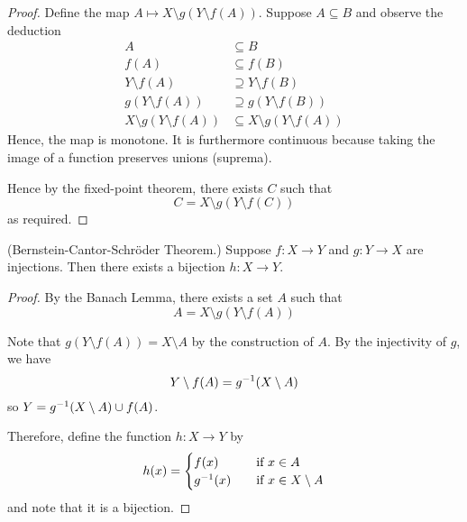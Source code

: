 \documentclass[11pt]{article}
\begin{document}
\begin{proof}
    Define the map $A \mapsto X \setminus g(Y \setminus f(A))$.
    Suppose $A \subseteq B$ and observe the deduction
    \begin{align*}
        A &\subseteq B \\
        f(A) &\subseteq f(B) \\
        Y \setminus f(A) &\supseteq Y \setminus f(B) \\
        g(Y \setminus f(A)) &\supseteq g(Y \setminus f(B)) \\
        X \setminus g(Y \setminus f(A))
            &\subseteq X \setminus g(Y \setminus f(A))
    \end{align*}
    Hence, the map is monotone. It is furthermore continuous because taking the
    image of a function preserves unions (suprema).

    Hence by the fixed-point theorem, there exists $C$ such that
    \begin{equation*}
        C = X \setminus g(Y \setminus f(C))
    \end{equation*}
    as required.
\end{proof}

\begin{prop}{(Bernstein-Cantor-Schr\"oder Theorem.)}
    Suppose $f : X \to Y$ and $g : Y \to X$ are injections.
    Then there exists a bijection $h : X \to Y$.
\end{prop}

\begin{proof}
    By the Banach Lemma, there exists a set $A$ such that
    \begin{equation*}
        A = X \setminus g(Y \setminus f(A))
    \end{equation*}

    Note that $g(Y \setminus f(A)) = X \setminus A$ by the construction of $A$.
    By the injectivity of $g$, we have
    \begin{equation*}
        Y \setminus f(A) = g^{-1}(X \setminus A)
    \end{equation*}
    so $Y = g^{-1}(X \setminus A) \cup f(A)$.

    Therefore, define the function $h : X \to Y$ by
    \begin{equation*}
        h(x) = \begin{cases}
            f(x) &\quad\text{if } x \in A \\
            g^{-1}(x) &\quad\text{if } x \in X \setminus A
        \end{cases}
    \end{equation*}
    and note that it is a bijection.
\end{proof}
\end{document}
